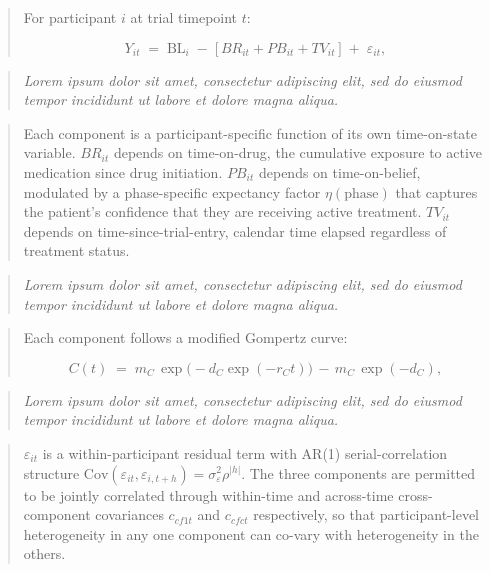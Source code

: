 \documentclass[
  11pt,
]{article}
\newenvironment{rgt}{%
  \begin{quote}\small\itshape\color[RGB]{20,60,160}}{%
  \end{quote}}
\newenvironment{orig}{%
  \begin{quote}\normalsize\color[gray]{0.55}}{%
  \end{quote}}
\begin{document}
\begin{orig}
For participant \(i\) at trial timepoint \(t\):

\[
Y_{it} \;=\; \mathrm{BL}_i \;-\; \bigl[\,BR_{it} + PB_{it} +
TV_{it}\,\bigr] \;+\; \varepsilon_{it},
\]

\end{orig}

\begin{rgt}
Lorem ipsum dolor sit amet, consectetur adipiscing elit, sed do eiusmod tempor incididunt ut labore et dolore magna aliqua.

\end{rgt}

\begin{orig}
Each component is a participant-specific function of its own
time-on-state variable. \(BR_{it}\) depends on time-on-drug, the
cumulative exposure to active medication since drug initiation.
\(PB_{it}\) depends on time-on-belief, modulated by a
phase-specific expectancy factor \(\eta(\text{phase})\) that
captures the patient's confidence that they are receiving active
treatment. \(TV_{it}\) depends on time-since-trial-entry,
calendar time elapsed regardless of treatment status.

\end{orig}

\begin{rgt}
Lorem ipsum dolor sit amet, consectetur adipiscing elit, sed do eiusmod tempor incididunt ut labore et dolore magna aliqua.

\end{rgt}

\begin{orig}
Each component follows a modified Gompertz curve:

\[
C(t) \;=\; m_C \,\exp\bigl(-d_C \exp(-r_C t)\bigr) \,-\,
m_C\,\exp(-d_C),
\]

\end{orig}

\begin{rgt}
Lorem ipsum dolor sit amet, consectetur adipiscing elit, sed do eiusmod tempor incididunt ut labore et dolore magna aliqua.

\end{rgt}

\begin{orig}
\(\varepsilon_{it}\) is a within-participant residual term with
AR(1) serial-correlation structure
\(\mathrm{Cov}(\varepsilon_{it}, \varepsilon_{i,t+h}) =
\sigma^2_\varepsilon \rho^{|h|}\). The three components are
permitted to be jointly correlated through within-time and
across-time cross-component covariances \(c_{cf1t}\) and
\(c_{cfct}\) respectively, so that participant-level heterogeneity
in any one component can co-vary with heterogeneity in the
others.

\end{orig}
\end{document}
